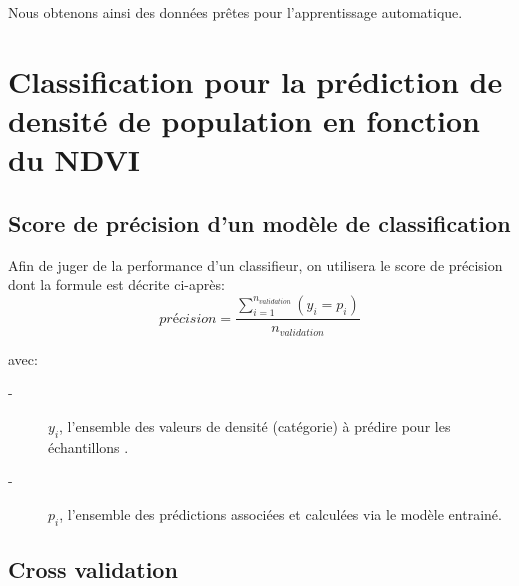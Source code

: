 \documentclass{book}
\begin{document}
Nous obtenons ainsi des données prêtes pour l'apprentissage automatique.


\chapter{Classification pour la prédiction de densité de population en fonction du NDVI}
 
\section{Score de précision d'un modèle de classification}

Afin de juger de la performance d'un classifieur, on utilisera le score de précision dont la formule est décrite ci-après:\\

\begin{equation}
précision = \frac{\sum \limits_{\underset{}{i=1}}^{n_{validation}} (y_i = p_i)}{n_{validation}}
\end{equation}

avec:
\begin{description}
\item[-] ${y_i}$, l'ensemble des valeurs de densité (catégorie) à prédire pour les échantillons .
\item[-] ${p_i}$, l'ensemble des prédictions associées et calculées via le modèle entrainé.
\end{description}

\section{Cross validation}
\end{document}
